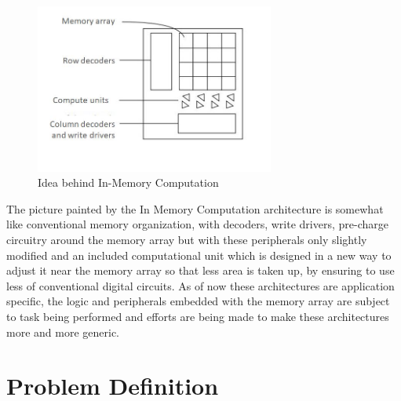 \begin{figure}[htbp!]
\centering
\includegraphics[width=0.7\textwidth]{fig2.JPG}
\caption{Idea behind In-Memory Computation}
\label{fig:Figure}
\end{figure}

The picture painted by the In Memory Computation architecture is somewhat like conventional memory organization, with decoders, write drivers, pre-charge circuitry around the memory array but with these peripherals only slightly modified and an included computational unit which is designed in a new way to adjust it near the memory array so that less area is taken up, by ensuring to use less of conventional digital circuits. As of now these architectures are application specific, the logic and peripherals embedded with the memory array are subject to task being performed and efforts are being made to make these architectures more and more generic.  

\section{Problem Definition}

\paragraph{}

